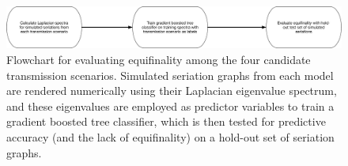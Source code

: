     
    
    \begin{figure}[ht]
    \centering
    \includegraphics[scale=0.25]{graphics/multipleseriation/theoretical-classification-equifinality-workflow.pdf}
    \caption{Flowchart for evaluating equifinality among the four candidate transmission scenarios.  Simulated seriation graphs from each model are rendered numerically using their Laplacian eigenvalue spectrum, and these eigenvalues are employed as predictor variables to train a gradient boosted tree classifier, which is then tested for predictive accuracy (and the lack of equifinality) on a hold-out set of seriation graphs.}
    \label{metapop:fig:equifinality-assessement-flowchart}
    \end{figure}
    
